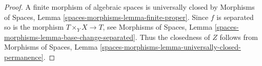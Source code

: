 \documentclass{stacks-project}
\theoremstyle{plain}
\theoremstyle{definition}
\theoremstyle{remark}
\numberwithin{equation}{subsection}
\begin{document}
\begin{proof}
A finite morphism of algebraic spaces is universally closed by
Morphisms of Spaces, Lemma \ref{spaces-morphisms-lemma-finite-proper}.
Since $f$ is separated so is the morphism $T \times_Y X \to T$, see
Morphisms of Spaces, Lemma \ref{spaces-morphisms-lemma-base-change-separated}.
Thus the closedness of $Z$ follows from
Morphisms of Spaces,
Lemma \ref{spaces-morphisms-lemma-universally-closed-permanence}.
\end{proof}
\end{document}
